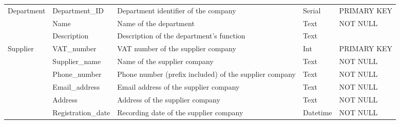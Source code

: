 \begin{longtable}{|p{}|p{} |p{}|p{}|p{} |}
\multirow{3}{*}{Department} & Department\_ID & Department identifier of the company & Serial & PRIMARY KEY\\\cline{2-5}
& Name & Name of the department & Text & NOT NULL \\\cline{2-5}
& Description & Description of the department's function & Text & \\\hline

\multirow{6}{*}{Supplier} & VAT\_number & VAT number of the supplier company & Int & PRIMARY KEY\\\cline{2-5}
& Supplier\_name & Name of the supplier company & Text & NOT NULL \\\cline{2-5}
& Phone\_number & Phone number (prefix included) of the supplier company  & Text & NOT NULL \\\cline{2-5}
& Email\_address & Email address of the supplier company & Text & NOT NULL \\\cline{2-5}
& Address & Address of the supplier company & Text & NOT NULL \\\cline{2-5}
& Registration\_date & Recording date of the supplier company & Datetime & NOT NULL \\\hline

\end{longtable}
